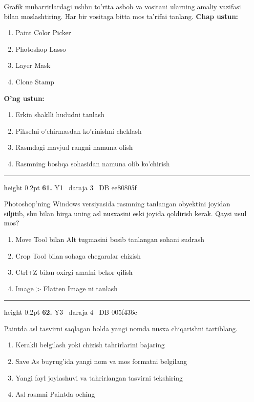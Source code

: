\documentclass[10pt,a4paper,oneside]{article}
\begin{document}
\par
Grafik muharrirlardagi ushbu to'rtta asbob va vositani ularning amaliy vazifasi bilan moslashtiring. Har bir vositaga bitta mos ta'rifni tanlang.
\textbf{\footnotesize Chap ustun:}
\begin{enumerate}[label=\arabic*),leftmargin=9mm]
\item Paint Color Picker
\item Photoshop Lasso
\item Layer Mask
\item Clone Stamp
\end{enumerate}
\textbf{\footnotesize O'ng ustun:}
\begin{enumerate}[label=\Alph*),leftmargin=9mm]
\item Erkin shaklli hududni tanlash
\item Pikselni o'chirmasdan ko'rinishni cheklash
\item Rasmdagi mavjud rangni namuna olish
\item Rasmning boshqa sohasidan namuna olib ko'chirish
\end{enumerate}
\vspace{2mm}\hrule height 0.2pt \vspace{4mm}
\hypertarget{q61}{\textbf{\color{ink}61.}}  {\color{muted}\scriptsize Y1 \textbullet\ daraja 3 \textbullet\ DB ee80805f}
\par
Photoshop'ning Windows versiyasida rasmning tanlangan obyektini joyidan siljitib, shu bilan birga uning asl nusxasini eski joyida qoldirish kerak. Qaysi usul mos?
\begin{enumerate}[label=\Alph*),leftmargin=9mm]
\item Move Tool bilan Alt tugmasini bosib tanlangan sohani sudrash
\item Crop Tool bilan sohaga chegaralar chizish
\item Ctrl+Z bilan oxirgi amalni bekor qilish
\item Image \textgreater{} Flatten Image ni tanlash
\end{enumerate}
\vspace{2mm}\hrule height 0.2pt \vspace{4mm}
\hypertarget{q62}{\textbf{\color{ink}62.}}  {\color{muted}\scriptsize Y3 \textbullet\ daraja 4 \textbullet\ DB 005f436e}
\par
Paintda asl tasvirni saqlagan holda yangi nomda nusxa chiqarishni tartiblang.
\begin{enumerate}[label=\Alph*),leftmargin=9mm]
\item Kerakli belgilash yoki chizish tahrirlarini bajaring
\item Save As buyrug'ida yangi nom va mos formatni belgilang
\item Yangi fayl joylashuvi va tahrirlangan tasvirni tekshiring
\item Asl rasmni Paintda oching
\end{enumerate}
\end{document}
